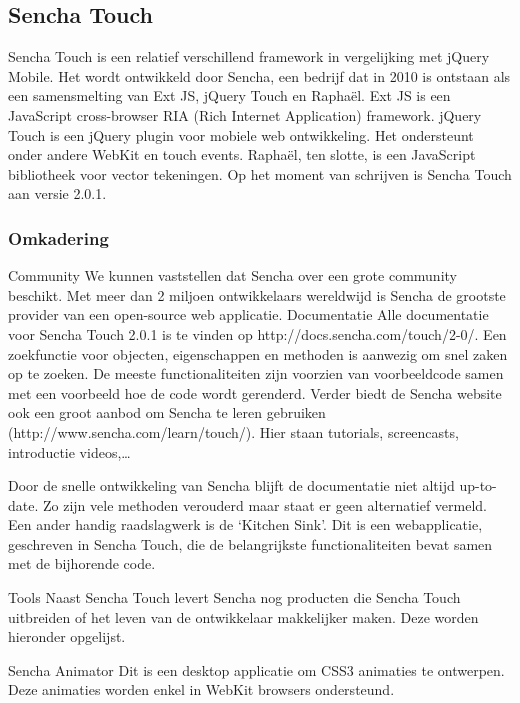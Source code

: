 
\subsection{Sencha Touch}

Sencha Touch is een relatief verschillend framework in vergelijking met jQuery Mobile.  Het wordt ontwikkeld door Sencha,  een bedrijf dat in 2010 is ontstaan als een samensmelting van Ext JS,  jQuery Touch en Raphaël.  Ext JS is een JavaScript cross-browser RIA (Rich Internet Application) framework. jQuery Touch is een jQuery plugin voor mobiele web ontwikkeling.  Het ondersteunt onder andere WebKit en touch events.  Raphaël,  ten slotte,  is een JavaScript bibliotheek voor vector tekeningen. Op het moment van schrijven is Sencha Touch aan versie 2.0.1.  

\subsubsection{Omkadering}
Community
We kunnen vaststellen dat Sencha over een grote community beschikt.  Met meer dan 2 miljoen ontwikkelaars wereldwijd is Sencha de grootste provider van een open-source web applicatie.  
Documentatie
Alle documentatie voor Sencha Touch 2.0.1 is te vinden op http://docs.sencha.com/touch/2-0/.  Een zoekfunctie voor objecten,  eigenschappen en methoden is aanwezig om snel zaken op te zoeken.  De meeste functionaliteiten zijn voorzien van voorbeeldcode samen met een voorbeeld hoe de code wordt gerenderd.  Verder biedt de Sencha website ook een groot aanbod om Sencha te leren gebruiken (http://www.sencha.com/learn/touch/).  Hier staan tutorials,  screencasts,  introductie videos,…

Door de snelle ontwikkeling van Sencha blijft de documentatie niet altijd up-to-date.  Zo zijn vele methoden verouderd maar staat er geen alternatief vermeld. Een ander handig raadslagwerk is de ‘Kitchen Sink'.  Dit is een webapplicatie,  geschreven in Sencha Touch,  die de belangrijkste functionaliteiten bevat samen met de bijhorende code.  

Tools
Naast Sencha Touch levert Sencha nog producten die Sencha Touch uitbreiden of het leven van de ontwikkelaar makkelijker maken.  Deze worden hieronder opgelijst.  

Sencha Animator
Dit is een desktop applicatie om CSS3 animaties te ontwerpen.  Deze animaties worden enkel in WebKit browsers ondersteund.

